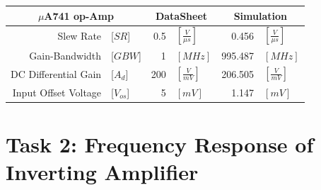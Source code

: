 \documentclass[11pt,a4paper]{article}
\begin{document}
\begin{enumerate}
\begin{minipage}{\linewidth}
\begin{center}
  \begin{tabular}{r l r l r l}
	\multicolumn{2}{c}{$\mu$A741 op-Amp} &   
  \multicolumn{2}{c}{DataSheet} &
  \multicolumn{2}{c}{Simulation}\\
  \hline
  \vspace{0.2em}
  Slew Rate & [$SR$] & 0.5 & $ [\frac{V}{\mu s}]$ & 0.456& $      [\frac{V}{\mu s}]$ \\
  	\vspace{0.2em}
  Gain-Bandwidth & [$GBW$]& 1 &$ [MHz]$  & 995.487 &$ [MHz]$ \\
  	\vspace{0.2em}
  DC Differential Gain &[$A_{d}$] & 200& $[\frac{V}{mV}]$ & 206.505& $[\frac{V}{mV}]$ \\
  	\vspace{0.2em}
  Input Offset Voltage &[$V_{os}$] & 5& $[mV]$& 1.147& $[mV]$ \\
    \end{tabular}
\end{center}
\end{minipage}
\end{enumerate}

\section*{Task 2: Frequency Response of Inverting Amplifier}
\end{document}
